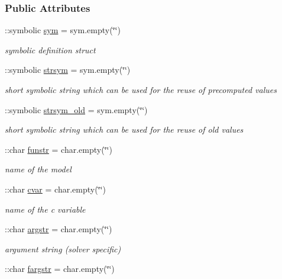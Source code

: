 \subsubsection*{Public Attributes}
\begin{DoxyCompactItemize}
\item 
\+::symbolic \hyperlink{classamifun_a3c48fff3d28406486a4f1b5e18da7ca6}{sym} = sym.\+empty(\char`\"{}\char`\"{})
\begin{DoxyCompactList}\small\item\em symbolic definition struct \end{DoxyCompactList}\item 
\+::symbolic \hyperlink{classamifun_a4814315a739f43461b003c1c1ef6f550}{strsym} = sym.\+empty(\char`\"{}\char`\"{})
\begin{DoxyCompactList}\small\item\em short symbolic string which can be used for the reuse of precomputed values \end{DoxyCompactList}\item 
\+::symbolic \hyperlink{classamifun_ac42759baa6575c9d39f487be5a2e01a1}{strsym\+\_\+old} = sym.\+empty(\char`\"{}\char`\"{})
\begin{DoxyCompactList}\small\item\em short symbolic string which can be used for the reuse of old values \end{DoxyCompactList}\item 
\+::char \hyperlink{classamifun_a484b54379bc8b29b6ce65d84966ea4c4}{funstr} = char.\+empty(\char`\"{}\char`\"{})
\begin{DoxyCompactList}\small\item\em name of the model \end{DoxyCompactList}\item 
\+::char \hyperlink{classamifun_a716c1ceb8235bc1005b606f777530ede}{cvar} = char.\+empty(\char`\"{}\char`\"{})
\begin{DoxyCompactList}\small\item\em name of the c variable \end{DoxyCompactList}\item 
\+::char \hyperlink{classamifun_aa3914760f4131288b95f0f23d0fdfa6d}{argstr} = char.\+empty(\char`\"{}\char`\"{})
\begin{DoxyCompactList}\small\item\em argument string (solver specific) \end{DoxyCompactList}\item 
\+::char \hyperlink{classamifun_acdb54dfb4e0a737dba0367c5958e779e}{fargstr} = char.\+empty(\char`\"{}\char`\"{})

\end{DoxyCompactItemize}
